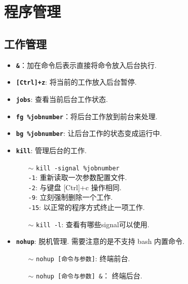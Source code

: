 \section{程序管理}
\subsection{工作管理}
\begin{itemize}
\item \textbf{\texttt{\&}}：加在命令后表示直接将命令放入后台执行.

\item \textbf{\texttt{[Ctrl]+z}}: 将当前的工作放入后台暂停.

\item \textbf{\texttt{jobs}}: 查看当前后台工作状态.

\item \textbf{\texttt{fg \%jobnumber}}：将后台工作放到前台来处理.

\item \textbf{\texttt{bg \%jobnumber}}: 让后台工作的状态变成运行中.

\item \textbf{\texttt{kill}}: 管理后台的工作. 
    \begin{itemize}
        \item[$\sim$] \texttt{kill -signal \%jobnumber} \\
        \texttt{-1}: 重新读取一次参数配置文件.\\
        \texttt{-2}: 与键盘 [Ctrl]+c 操作相同. \\
        \texttt{-9}: 立刻强制删除一个工作. \\
        \texttt{-15}: 以正常的程序方式终止一项工作.
        
        \item[$\sim$] \texttt{kill -l}: 查看有哪些signal可以使用. 
    \end{itemize}
    
\item \textbf{\texttt{nohup}}: 脱机管理. 需要注意的是不支持 bash 内置命令.
    \begin{itemize}
        \item[$\sim$] \texttt{nohup [命令与参数]}: 终端前台.

        \item[$\sim$] \texttt{nohup [命令与参数] \&}： 终端后台.
    \end{itemize}
\end{itemize}


